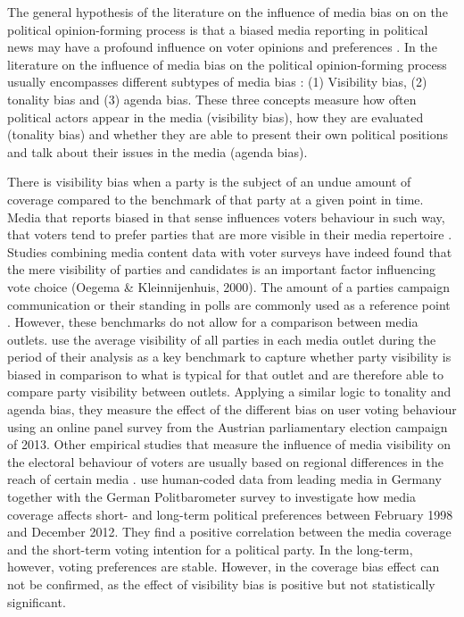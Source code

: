 \documentclass[12pt,a4paper,notitlepage]{article}
\begin{document}
The general hypothesis of the literature on the influence of media bias on on the political opinion-forming process is that a biased media reporting in political news may have a profound influence on voter opinions and preferences \citep{ferree_four_2002, mccombs_look_2005, eberl_one_2017}. In the literature on the influence of media bias on the political opinion-forming process usually encompasses different subtypes of media bias \citep{eberl_one_2017, dalessio_media_2000}: (1) Visibility bias, (2) tonality bias and (3) agenda bias. These three concepts measure how often political actors appear in the media (visibility bias), how they are evaluated (tonality bias) and whether they are able to present their own political positions and talk about their issues in the media (agenda bias).
  
There is visibility bias when a party is the subject of an undue amount of coverage compared to the benchmark of that party at a given point in time. Media that reports biased in that sense influences voters behaviour in such way, that voters tend to prefer parties that are more visible in their media repertoire \citep{eberl_one_2017}. Studies combining media content data with voter surveys have indeed found that the mere visibility of parties and candidates is an important factor influencing vote choice (Oegema & Kleinnijenhuis, 2000). The amount of a parties campaign communication or their standing in polls are commonly used as a reference point \citep{junque_de_fortuny_media_2012, hopmann_political_2012}. However, these benchmarks do not allow for a comparison between media outlets. \citet{eberl_one_2017} use the average visibility of all parties in each media outlet during the period of their analysis as a key benchmark to capture whether party visibility is biased in comparison to what is typical for that outlet and are therefore able to compare party visibility between outlets. Applying a similar logic to tonality and agenda bias, they measure the effect of the different bias on user voting behaviour using an online panel survey from the Austrian parliamentary election campaign of 2013. Other empirical studies that measure the influence of media visibility on the electoral behaviour of voters are usually based on regional differences in the reach of certain media \citep{enikolopov_media_2011, dellavigna_fox_2006, snyder_press_2010}. \citet{dewenter_can_2018} use human-coded data from leading media in Germany together with the German Politbarometer survey to investigate how media coverage affects short- and long-term political preferences between February 1998 and December 2012. They find a positive correlation between the media coverage and the short-term voting intention for a political party. In the long-term, however, voting preferences are stable. However, in \citet{eberl_one_2017} the coverage bias effect can not be confirmed, as the effect of visibility bias is positive but not statistically significant.
\end{document}
